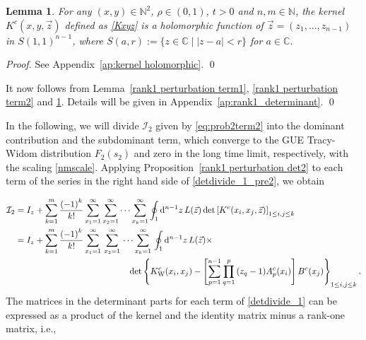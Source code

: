 \documentclass[cmp]{svjour}
\numberwithin{theorem}{section}
\numberwithin{equation}{section}
\def\dd{{\rm d}}
\newtheorem{lemman}[theorem]{Lemma}
\begin{document}
\medskip

\begin{lemman}
\label{kernel holomorphic}
For any $(x , y) \in \mathbb{N}^2$, $\rho \in (0,1)$, $t > 0$ and $n, m \in \mathbb{N}$, the kernel $K^c(x,y,\vec{z})$ defined as \eqref{Kxyz} is a holomorphic function of $\vec{z} = (z_1,\ldots, z_{n-1})$ in ${S(1,1)}^{n-1}$, where $S(a,r) := \{ z \in \mathbb{C} \mid |z - a| < r \}$ for $a \in \mathbb{C}$.

\end{lemman}


\begin{proof}
See Appendix~\ref{ap:kernel holomorphic}.
\qed
\end{proof}

 It now follows from Lemma~\ref{rank1 perturbation term1}, \ref{rank1 perturbation term2} and \ref{kernel holomorphic}. Details will be given in 
Appendix~\ref{ap:rank1_determinant}. \qed

\medskip

In the following, we will divide $\mathcal{I}_2$ given by \eqref{eq:prob2term2} into the dominant contribution and the subdominant term, which converge to the GUE Tracy-Widom distribution $F_2(s_2)$ and zero in the long time limit, respectively, with the scaling \eqref{nmscale}.
Applying Proposition~\ref{rank1 perturbation det2} to each term of the series in the right hand side of \eqref{detdivide_1_pre2}, we obtain

\begin{equation}
\begin{split}
\label{detdivide_1}
\mathcal{I}_2 
& =  I_z + \sum_{k=1}^{m}{ \frac{{(-1)}^k}{k!} } \sum_{x_1 = 1}^{\infty}{ \sum_{x_2 = 1}^{\infty}{ \cdots \sum_{x_k = 1}^{\infty}{  \oint_1 \dd^{n-1} z\,  L(\vec{z}) \det\left[ K^c(x_i, x_j , \vec{z}) \right]_{1 \leq i , j \leq k} } } } \\
& \begin{multlined} = I_z + \sum_{k=1}^{m}{ \frac{{(-1)}^k}{k!} } \sum_{x_1 = 1}^{\infty}{} \sum_{x_2 = 1}^{\infty}{} \cdots \sum_{x_k = 1}^{\infty}{ }  \oint_1 \dd^{n-1} z\,  L(\vec{z}) \times  \\ \qquad\qquad\qquad\qquad\qquad\qquad \det\left\{ K_{\mathrm{W}}^c(x_i, x_j ) - \left[ \sum_{p=1}^{n-1}{ \prod_{q=1}^{p}{ (z_q - 1) } A^c_p(x_i) }  \right] B^c(x_j) \right\}_{1 \leq i , j \leq k} .
\end{multlined}
\end{split}
\end{equation}
The matrices in the determinant parts for each term of \eqref{detdivide_1} can be expressed as a product of the kernel and the identity matrix minus a rank-one matrix, i.e.,
\end{document}
